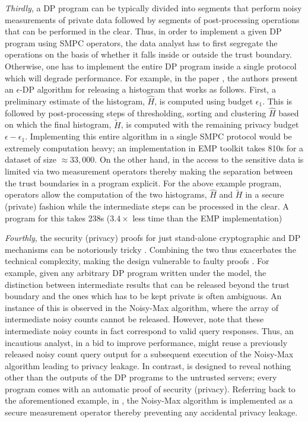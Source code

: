 \textit{Thirdly}, a DP program can be typically divided into segments that perform noisy measurements of private data followed by segments of post-processing operations that can be performed in the clear. Thus, in order to implement a given DP program using SMPC operators, the data analyst has to first segregate the operations on the basis of whether it falls inside or outside the trust boundary. Otherwise, one has to implement the entire DP program inside a single protocol which will degrade performance. For  example, in the paper \cite{AHP}, the authors present an $\epsilon$-DP algorithm for releasing a histogram that works as follows. First, a preliminary estimate of the histogram, $\hat{H}$, is computed using budget $\epsilon_1$. This is followed by post-processing steps of thresholding, sorting and clustering $\hat{H}$ based on which the final histogram, $\tilde{H}$, is computed with the remaining privacy budget $\epsilon-\epsilon_1$. Implementing this entire algorithm in a single SMPC protocol would be extremely computation heavy; an implementation in EMP toolkit \cite{EMP} takes 810s for a dataset of size $\approx 33,000$.  On the other hand,
in \system the access to the sensitive data is limited via two measurement operators thereby making the separation between the trust boundaries in a program explicit. For the above example program, \system operators allow the computation of the two histograms, $\hat{H}$ and $\tilde{H}$ in a secure (private) fashion while the intermediate steps can be processed in the clear. A \system program for this takes 238s ($3.4\times$ less time than the EMP implementation)

\textit{Fourthly}, the security (privacy) proofs for just stand-alone cryptographic and DP mechanisms can be notoriously tricky \cite{BellareCryptoError,DPSVTProof}. Combining the two thus exacerbates the technical complexity, making the design vulnerable to faulty proofs \cite{He:2017:CDP}. For example, given any arbitrary DP program written under the \cdp model, the distinction between intermediate results that can be released beyond the trust boundary and the ones which has to be kept private is often ambiguous. An instance of this is observed in the Noisy-Max algorithm, where the array of intermediate noisy counts cannot be released.  However, note that these intermediate noisy counts in fact correspond to valid query responses. Thus, an incautious analyst, in a bid to improve performance, might reuse a previously released noisy count query output for a subsequent execution of the Noisy-Max algorithm leading to privacy leakage. In contrast, \system is designed to reveal nothing other than the outputs of the DP programs to the untrusted servers; every \system program comes with an automatic proof of security (privacy). Referring back to the aforementioned example, in \system, the Noisy-Max algorithm is implemented as a secure measurement operator thereby preventing any accidental privacy leakage. 


